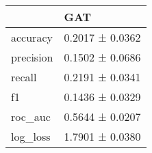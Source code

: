 \begin{tabular}{ll}
\toprule
 & GAT \\
\midrule
accuracy & 0.2017 ± 0.0362 \\
precision & 0.1502 ± 0.0686 \\
recall & 0.2191 ± 0.0341 \\
f1 & 0.1436 ± 0.0329 \\
roc_auc & 0.5644 ± 0.0207 \\
log_loss & 1.7901 ± 0.0380 \\
\bottomrule
\end{tabular}
